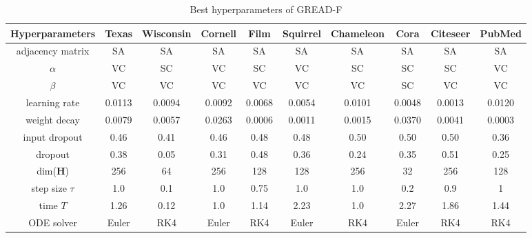 \documentclass{article}
\theoremstyle{plain}
\theoremstyle{definition}
\theoremstyle{remark}
\begin{document}
\begin{table*}[ht!]
    \centering
    \small
    \caption{Best hyperparameters of GREAD-F}
    \label{tab:best_F}
    \begin{tabular}{c ccccccccc} \toprule
        Hyperparameters  & Texas  & Wisconsin 
                                           & Cornell& Film   & Squirrel 
                                                                      & Chameleon
                                                                               & Cora   & Citeseer 
                                                                                                 & PubMed\\ \midrule
        adjacency matrix & SA     & SA     & SA     & SA     & SA     & SA     & SA     & SA     & SA    \\
        $\alpha$         & VC     & SC     & VC     & SC     & VC     & SC     & SC     & SC     & VC    \\
        $\beta$          & VC     & VC     & VC     & VC     & VC     & VC     & SC     & VC     & VC    \\
        learning rate    & 0.0113 & 0.0094 & 0.0092 & 0.0068 & 0.0054 & 0.0101 & 0.0048 & 0.0013 & 0.0120\\
        weight decay     & 0.0079 & 0.0057 & 0.0263 & 0.0006 & 0.0011 & 0.0015 & 0.0370 & 0.0041 & 0.0003\\
        input dropout    & 0.46   & 0.41   & 0.46   & 0.48   & 0.48   & 0.50   & 0.50   & 0.50   & 0.36\\
        dropout          & 0.38   & 0.05   & 0.31   & 0.48   & 0.36   & 0.24   & 0.35   & 0.51   & 0.25\\
        dim($\mathbf{H}$)& 256    & 64     & 256    & 128    & 128    & 256    & 32     & 256    & 128\\
        step size $\tau$ & 1.0    & 0.1    & 1.0    & 0.75   & 1.0    & 1.0    & 0.2    & 0.9    & 1\\
        time $T$         & 1.26   & 0.12   & 1.0    & 1.14   & 2.23   & 1.0    & 2.27   & 1.86   & 1.44\\
        ODE solver       & Euler  & RK4  & Euler  & RK4    & Euler  & RK4    & Euler    & RK4    & RK4  \\
        \bottomrule
    \end{tabular}
\end{table*}
\end{document}
